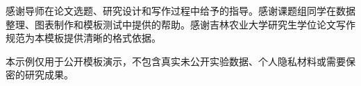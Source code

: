 感谢导师在论文选题、研究设计和写作过程中给予的指导。感谢课题组同学在数据整理、图表制作和模板测试中提供的帮助。感谢吉林农业大学研究生学位论文写作规范为本模板提供清晰的格式依据。

本示例仅用于公开模板演示，不包含真实未公开实验数据、个人隐私材料或需要保密的研究成果。
